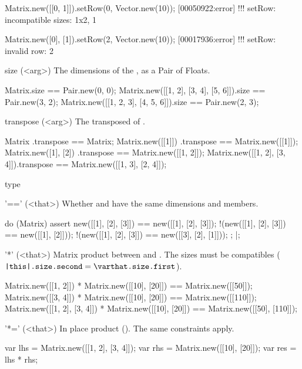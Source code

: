 \begin{urbiscriptapi}
\begin{urbiscript}
Matrix.new([[0, 1]]).setRow(0, Vector.new(10));
[00050922:error] !!! setRow: incompatible sizes: 1x2, 1

Matrix.new([0], [1]).setRow(2, Vector.new(10));
[00017936:error] !!! setRow: invalid row: 2
\end{urbiscript}

\item[size](<arg>)%
  The dimensions of the \this, as a Pair of Floats.
\begin{urbiassert}
Matrix.size == Pair.new(0, 0);
Matrix.new([[1, 2], [3, 4], [5, 6]]).size == Pair.new(3, 2);
Matrix.new([[1, 2, 3], [4, 5, 6]]).size == Pair.new(2, 3);
\end{urbiassert}

\item[transpose](<arg>)%
  The transposed of \this.
\begin{urbiassert}
Matrix                      .transpose == Matrix;
Matrix.new([[1]])           .transpose == Matrix.new([[1]]);
Matrix.new([1], [2])        .transpose == Matrix.new([[1, 2]]);
Matrix.new([[1, 2], [3, 4]]).transpose == Matrix.new([[1, 3], [2, 4]]);
\end{urbiassert}

\item[type]%
\begin{urbiassert}

\end{urbiassert}

\item['=='](<that>)%
  Whether \this and \that have the same dimensions and members.
\begin{urbiscript}
do (Matrix)
{
  assert
  {
      new([[1], [2], [3]]) == new([[1], [2], [3]]);
    !(new([[1], [2], [3]]) == new([[1], [2]]));
    !(new([[1], [2], [3]]) == new([[3], [2], [1]]));
  };
}|;
\end{urbiscript}

\item['*'](<that>)%
  Matrix product between \this and \that.  The sizes must be compatibles
  ($\texttt{\this.size.second} = \texttt{\that.size.first}$).
\begin{urbiassert}
Matrix.new([[1, 2]]) * Matrix.new([[10], [20]])
  == Matrix.new([[50]]);
Matrix.new([[3, 4]]) * Matrix.new([[10], [20]])
  == Matrix.new([[110]]);
Matrix.new([[1, 2], [3, 4]]) * Matrix.new([[10], [20]])
  == Matrix.new([[50], [110]]);
\end{urbiassert}

\item['*='](<that>)%
  In place product ().  The same constraints apply.
\begin{urbiassert}
var lhs = Matrix.new([[1, 2], [3, 4]]);
var rhs = Matrix.new([[10], [20]]);
var res = lhs * rhs;


\end{urbiassert}
\end{urbiscriptapi}
